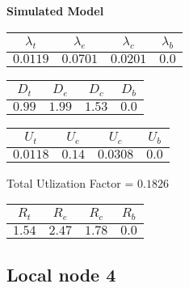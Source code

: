 \documentclass{article}
\begin{document}
\begin{minipage}{0.5\textwidth}
\centering	\textbf{Simulated Model}
\begin{table}[H]
\centering
\begin{tabular}{@{}cccc@{}}
\toprule
$\lambda_t$ & $\lambda_e$ & $\lambda_c$ & $\lambda_b$\\
\midrule
$0.0119$ & $0.0701$ & $0.0201$ & $0.0$\\
\bottomrule
\end{tabular}
\end{table}
\begin{table}[H]
\centering
\begin{tabular}{@{}cccc@{}}
\toprule
$D_t$ & $D_e$ & $D_c$ & $D_b$\\
\midrule
$0.99$ & $1.99$ & $1.53$ & $0.0$\\
\bottomrule
\end{tabular}
\end{table}\begin{table}[H]
\centering
\begin{tabular}{@{}cccc@{}}
\toprule
$U_t$ & $U_e$ & $U_c$ & $U_b$\\
\midrule
$0.0118$ & $0.14$ & $0.0308$ & $0.0$\\
\bottomrule
\end{tabular}
\end{table}
\centering Total Utlization Factor = $0.1826$
\begin{table}[H]
\centering
\begin{tabular}{@{}cccc@{}}
\toprule
$R_t$ & $R_e$ & $R_c$ & $R_b$\\
\midrule
$1.54$ & $2.47$ & $1.78$ & $0.0$\\
\bottomrule
\end{tabular}
\end{table}
\end{minipage}\subsection{Local node 4}
\end{document}
